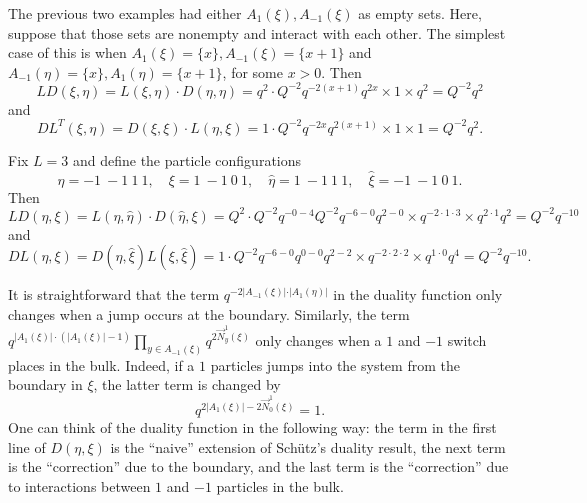 \documentclass[12pt]{ximera}
\begin{document}
\begin{example}
The previous two examples had either $A_1(\xi),A_{-1}(\xi)$ as empty sets. Here, suppose that those sets are nonempty and interact with each other. The simplest case of this is when $A_1(\xi) = \{x\},A_{-1}(\xi)= \{x+1\}$ and $A_{-1}(\eta)= \{x\} , A_1(\eta) = \{x+1\}$, for some $x>0$. Then
$$
LD(\xi,\eta) = L(\xi,\eta) \cdot D(\eta,\eta) = q^2 \cdot Q^{-2}q^{-2(x+1)}q^{2x} \times 1 \times q^2 = Q^{-2}q^2
$$
and
$$
DL^T(\xi,\eta) = D(\xi,\xi)\cdot L(\eta,\xi) = 1 \cdot Q^{-2}q^{-2x}q^{2(x+1)} \times 1 \times 1 = Q^{-2}q^2.
$$
\end{example}

\begin{example}
Fix $L=3$ and define the particle configurations
$$
\eta = -1 \ -1 \ 1 \ 1, \quad \xi = 1 \ -1 \ 0 \ 1, \quad \hat{\eta}= 1 \ -1 \ 1 \ 1, \quad \hat{\xi}= -1 \ -1 \ 0 \ 1.
$$
Then
$$
LD(\eta,\xi) = L(\eta,\hat{\eta}) \cdot D(\hat{\eta},\xi) = Q^2 \cdot Q^{-2}q^{-0-4}Q^{-2}q^{-6-0}q^{2-0}\times q^{-2 \cdot 1 \cdot 3} \times q^{2\cdot 1}q^2 = Q^{-2}q^{-10}
$$
and
$$
DL(\eta,\xi) = D(\eta, \hat{\xi}) L(\xi,\hat{\xi}) = 1\cdot Q^{-2}q^{-6-0}q^{0-0}q^{2-2} \times q^{-2 \cdot 2 \cdot 2} \times q^{1\cdot 0} q^4 = Q^{-2}q^{-10}.
$$
\end{example}

\begin{example}
It is straightforward that the term $q^{-2 \vert A_{-1}(\xi)\vert \cdot \vert A_1(\eta)\vert} $ in the duality function only changes when a jump occurs at the boundary. Similarly, the term $q^{\vert A_1(\xi)\vert \cdot ( \vert A_1(\xi)\vert -1)} \prod_{y \in A_{-1}(\xi)} q^{2\vec{N}_y^1(\xi)}$ only changes when a $1$ and $-1$ switch places in the bulk. Indeed, if a $1$ particles jumps into the system from the boundary in $\xi$, the latter term is changed by 
$$
q^{ 2\vert A_1(\xi)\vert - 2\vec{N}_0^1(\xi)} =1.
$$
One can think of the duality function in the following way: the term in the first line of $D(\eta,\xi)$ is the ``naive'' extension of Sch\"{u}tz's duality result, the next term is the ``correction'' due to the boundary, and the last term is the ``correction'' due to interactions between $1$ and $-1$ particles in the bulk.
\end{example}
\end{document}
